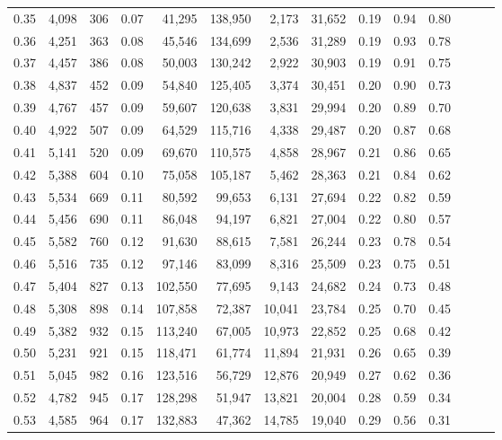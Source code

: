 \begin{tabular}{rrrrrrrrrrrrrr}
0.35 &  4,098 &    306 &  0.07 &   41,295 &  138,950 &   2,173 &  31,652 &  0.19 &  0.94 &      0.80 \\
0.36 &  4,251 &    363 &  0.08 &   45,546 &  134,699 &   2,536 &  31,289 &  0.19 &  0.93 &      0.78 \\
0.37 &  4,457 &    386 &  0.08 &   50,003 &  130,242 &   2,922 &  30,903 &  0.19 &  0.91 &      0.75 \\
0.38 &  4,837 &    452 &  0.09 &   54,840 &  125,405 &   3,374 &  30,451 &  0.20 &  0.90 &      0.73 \\
0.39 &  4,767 &    457 &  0.09 &   59,607 &  120,638 &   3,831 &  29,994 &  0.20 &  0.89 &      0.70 \\
0.40 &  4,922 &    507 &  0.09 &   64,529 &  115,716 &   4,338 &  29,487 &  0.20 &  0.87 &      0.68 \\
0.41 &  5,141 &    520 &  0.09 &   69,670 &  110,575 &   4,858 &  28,967 &  0.21 &  0.86 &      0.65 \\
0.42 &  5,388 &    604 &  0.10 &   75,058 &  105,187 &   5,462 &  28,363 &  0.21 &  0.84 &      0.62 \\
0.43 &  5,534 &    669 &  0.11 &   80,592 &   99,653 &   6,131 &  27,694 &  0.22 &  0.82 &      0.59 \\
0.44 &  5,456 &    690 &  0.11 &   86,048 &   94,197 &   6,821 &  27,004 &  0.22 &  0.80 &      0.57 \\
0.45 &  5,582 &    760 &  0.12 &   91,630 &   88,615 &   7,581 &  26,244 &  0.23 &  0.78 &      0.54 \\
0.46 &  5,516 &    735 &  0.12 &   97,146 &   83,099 &   8,316 &  25,509 &  0.23 &  0.75 &      0.51 \\
0.47 &  5,404 &    827 &  0.13 &  102,550 &   77,695 &   9,143 &  24,682 &  0.24 &  0.73 &      0.48 \\
0.48 &  5,308 &    898 &  0.14 &  107,858 &   72,387 &  10,041 &  23,784 &  0.25 &  0.70 &      0.45 \\
0.49 &  5,382 &    932 &  0.15 &  113,240 &   67,005 &  10,973 &  22,852 &  0.25 &  0.68 &      0.42 \\
0.50 &  5,231 &    921 &  0.15 &  118,471 &   61,774 &  11,894 &  21,931 &  0.26 &  0.65 &      0.39 \\
0.51 &  5,045 &    982 &  0.16 &  123,516 &   56,729 &  12,876 &  20,949 &  0.27 &  0.62 &      0.36 \\
0.52 &  4,782 &    945 &  0.17 &  128,298 &   51,947 &  13,821 &  20,004 &  0.28 &  0.59 &      0.34 \\
0.53 &  4,585 &    964 &  0.17 &  132,883 &   47,362 &  14,785 &  19,040 &  0.29 &  0.56 &      0.31 \\

\end{tabular}
